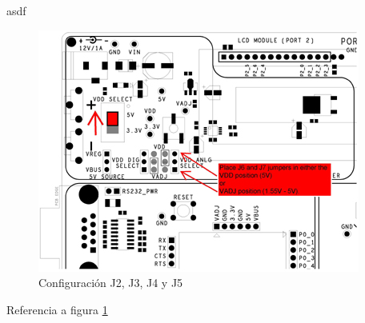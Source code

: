 asdf
\newline

\begin{figure}[H] %
	\centering
	\includegraphics[scale=1]{a.JPG} 
	\caption{Configuración J2, J3, J4 y J5}
	\label{fig:a}
	
\end{figure}

Referencia a figura \ref{fig:a} 


\newpage



